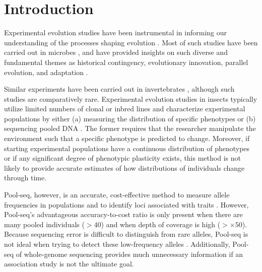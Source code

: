 

\section{Introduction}


Experimental evolution studies have been instrumental in informing our understanding
of the processes shaping evolution \citep{Elena:2003fr}. 
Most of such studies have been carried out in microbes
\citep[reviewed in][]{Dettman:2012gt,Jerison:2015kw}, and have provided insights on
such diverse and fundamental themes as historical contingency, evolutionary innovation,
parallel evolution, and adaptation
\citep{Blount:2008fo,Barrick:2009in,TollRiera:2016fd,Voordeckers:2015cl,Gerstein:2012ki}.


Similar experiments have been carried out in invertebrates
\citep{Gompert:2016eg,Chandler:2014bn,Burke:2010eq,Kang:2016ea,Rouchet:2014jl}, 
although such studies are comparatively rare.
Experimental evolution studies in insects typically utilize limited numbers of 
clonal or inbred lines \citep[e.g.,][]{Rouchet:2014jl,Kang:2016ea} and 
characterize experimental populations by either 
(a) measuring the distribution of specific phenotypes \citep[e.g.,][]{Rouchet:2014jl}
or
(b) sequencing pooled DNA \citep[``Pool-seq''; e.g.,][]{Burke:2010eq}.
The former requires that the researcher manipulate the environment such that a 
specific phenotype is predicted to change.
Moreover, if starting experimental populations have a continuous distribution of
phenotypes or if any significant degree of phenotypic plasticity exists, this method
is not likely to provide accurate estimates of how distributions of individuals change
through time.

Pool-seq, however, is an accurate, cost-effective method to measure allele frequencies
in populations \citep{Gautier:2013dv,Futschik:2010be}
and to identify loci associated with traits \citep{Rubin:2010es,Bastide:2013jx}.
However, Pool-seq's advantageous accuracy-to-cost ratio is only present when there
are many pooled individuals ($>40$) and when depth of coverage is high ($> \times 50$).
Because sequencing error is difficult to distinguish from rare alleles, 
Pool-seq is not ideal when trying to detect these low-frequency alleles
\citep{Schlotterer:2014dk}.
Additionally, Pool-seq of whole-genome sequencing provides much unnecessary 
information if an association study is not the ultimate goal.

